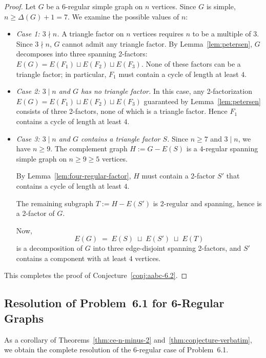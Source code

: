 \documentclass[11pt,reqno]{amsart}
\theoremstyle{definition}
\theoremstyle{remark}
\begin{document}
\begin{proof}
Let $G$ be a $6$-regular simple graph on $n$ vertices. Since $G$ is simple, $n \ge \Delta(G) + 1 = 7$. We examine the possible values of $n$:

\begin{itemize}
    \item \emph{Case 1: $3 \nmid n$.} A triangle factor on $n$ vertices requires $n$ to be a multiple of $3$. Since $3 \nmid n$, $G$ cannot admit any triangle factor. By Lemma~\ref{lem:petersen}, $G$ decomposes into three spanning 2-factors: $E(G) = E(F_1) \sqcup E(F_2) \sqcup E(F_3)$. None of these factors can be a triangle factor; in particular, $F_1$ must contain a cycle of length at least $4$.
    
    \item \emph{Case 2: $3 \mid n$ and $G$ has no triangle factor.} In this case, any 2-factorization $E(G) = E(F_1) \sqcup E(F_2) \sqcup E(F_3)$ guaranteed by Lemma~\ref{lem:petersen} consists of three 2-factors, none of which is a triangle factor. Hence $F_1$ contains a cycle of length at least $4$.
    
    \item \emph{Case 3: $3 \mid n$ and $G$ contains a triangle factor $S$.} Since $n \ge 7$ and $3 \mid n$, we have $n \ge 9$. The complement graph $H := G - E(S)$ is a $4$-regular spanning simple graph on $n \ge 9 \ge 5$ vertices.
    
    By Lemma~\ref{lem:four-regular-factor}, $H$ must contain a 2-factor $S'$ that contains a cycle of length at least $4$. 
    
    The remaining subgraph $T := H - E(S')$ is 2-regular and spanning, hence is a 2-factor of $G$.
    
    Now,
    \[
    E(G) \;=\; E(S) \;\sqcup\; E(S') \;\sqcup\; E(T)
    \]
    is a decomposition of $G$ into three edge-disjoint spanning 2-factors, and $S'$ contains a component with at least $4$ vertices.
\end{itemize}
This completes the proof of Conjecture~\ref{conj:aabc-6.2}.
\end{proof}

\subsection{Resolution of Problem~6.1 for 6-Regular Graphs}

As a corollary of Theorems~\ref{thm:ce-n-minus-2} and~\ref{thm:conjecture-verbatim}, we obtain the complete resolution of the $6$-regular case of Problem~6.1.
\end{document}
